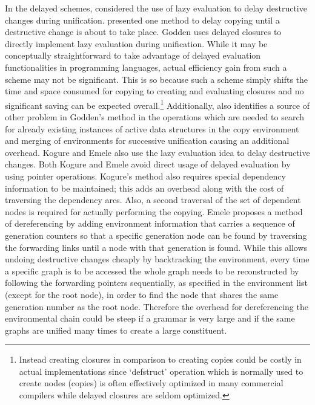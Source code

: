 In the delayed schemes, \cite{Karttunen} considered the use
of lazy evaluation to delay destructive changes during
unification.  \cite{Godden} presented one method to delay
copying until a destructive change is about to take place. 
Godden uses delayed closures to directly implement lazy
evaluation during unification.  While it may be conceptually
straightforward to take advantage of delayed evaluation
functionalities in programming languages, actual efficiency
gain from such a scheme may not be significant. This is so
because such a scheme simply shifts the time and space
consumed for copying to creating and evaluating closures and
no significant saving can be expected
overall.\footnote{Instead creating closures in comparison to
creating copies could be costly in actual implementations
since `defstruct' operation which is normally used to create
nodes (copies) is often effectively optimized in many
commercial compilers while delayed closures are seldom
optimized.} Additionally, \cite{Emele} also identifies a
source of other problem in Godden's method in the operations
which are needed to search for already existing instances of
active data structures in the copy environment and merging
of environments for successive unification causing an
additional overhead.  Kogure and Emele also use the lazy
evaluation idea to delay destructive changes. Both Kogure
and Emele avoid direct usage of delayed evaluation by using
pointer operations. Kogure's method also requires special
dependency information to be maintained; this adds an
overhead along with the cost of traversing the dependency
arcs. Also, a second traversal of the set of dependent nodes
is required for actually performing the copying. Emele
proposes a method of dereferencing by adding environment
information that carries a sequence of generation counters
so that a specific generation node can be found by
traversing the forwarding links until a node with that
generation is found. While this allows undoing destructive
changes cheaply by backtracking the environment, every time
a specific graph is to be accessed the whole graph needs to
be reconstructed by following the forwarding pointers
sequentially, as specified in the environment list (except
for the root node), in order to find the node that shares
the same generation number as the root node. Therefore the
overhead for dereferencing the environmental chain could be
steep if a grammar is very large and if the same graphs are
unified many times to create a large constituent.

